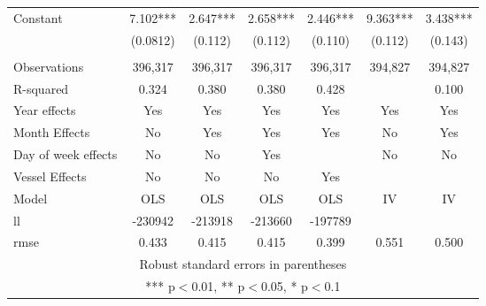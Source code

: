 \begin{tabular}{lcccccc}
Constant & 7.102*** & 2.647*** & 2.658*** & 2.446*** & 9.363*** & 3.438*** \\
 & (0.0812) & (0.112) & (0.112) & (0.110) & (0.112) & (0.143) \\
 &  &  &  &  &  &  \\
Observations & 396,317 & 396,317 & 396,317 & 396,317 & 394,827 & 394,827 \\
R-squared & 0.324 & 0.380 & 0.380 & 0.428 &  & 0.100 \\
Year effects & Yes & Yes & Yes & Yes & Yes & Yes \\
Month Effects & No & Yes & Yes & Yes & No & Yes \\
Day of week effects & No & No & Yes &  & No & No \\
Vessel Effects & No & No & No & Yes &  &  \\
Model & OLS & OLS & OLS & OLS & IV & IV \\
ll & -230942 & -213918 & -213660 & -197789 &  &  \\
 rmse & 0.433 & 0.415 & 0.415 & 0.399 & 0.551 & 0.500 \\ \hline
\multicolumn{7}{c}{ Robust standard errors in parentheses} \\
\multicolumn{7}{c}{ *** p$<$0.01, ** p$<$0.05, * p$<$0.1} \\
\end{tabular}
